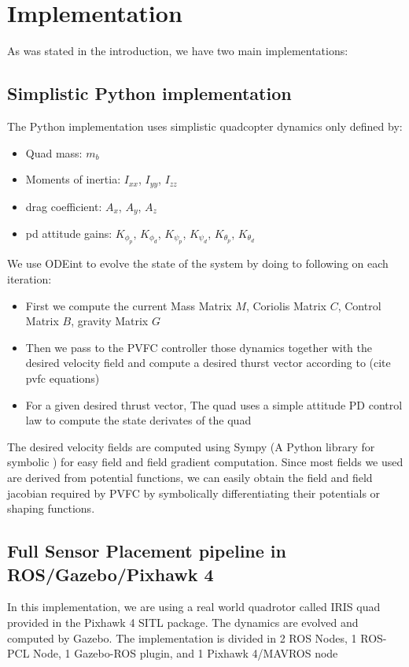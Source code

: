 \section{Implementation}
\label{Implementation section}
As was stated in the introduction, we have two main implementations: 
\subsection{Simplistic Python implementation}
The Python implementation uses simplistic quadcopter dynamics only defined by:
\begin{itemize}
    \item Quad mass: $m_b$
    \item Moments of inertia: $I_{xx}$, $I_{yy}$, $I_{zz}$
    \item drag coefficient: $A_{x}$, $A_{y}$, $A_{z}$
    \item pd attitude gains: $K_{\phi_{p}}$, $K_{\phi_{d}}$, $K_{\psi_{p}}$, $K_{\psi_{d}}$, $K_{\theta_{p}}$, $K_{\theta_{d}}$
\end{itemize}

We use ODEint to evolve the state of the system by doing to following on each iteration: 
\begin{itemize}
    \item First we compute the current Mass Matrix $M$, Coriolis Matrix $C$, Control Matrix $B$, gravity Matrix $G$
    \item Then we pass to the PVFC controller those dynamics together with the desired velocity field and compute a desired thurst vector according to (cite pvfc equations)
    \item For a given desired thrust vector, The quad uses a simple attitude PD control law to compute the state derivates of the quad
\end{itemize}


The desired velocity fields are computed using Sympy (A Python library for symbolic ) for easy field and field gradient computation. Since most fields we used are derived from potential functions, we can easily obtain the field and field jacobian required by PVFC by symbolically differentiating their potentials or shaping functions.

\subsection{Full Sensor Placement pipeline in ROS/Gazebo/Pixhawk 4}
In this implementation, we are using a real world quadrotor called IRIS quad provided in the Pixhawk 4 SITL package. 
The dynamics are evolved and computed by Gazebo. 
The implementation is divided in 2 ROS Nodes, 1 ROS-PCL Node, 1 Gazebo-ROS plugin, and 1 Pixhawk 4/MAVROS node
